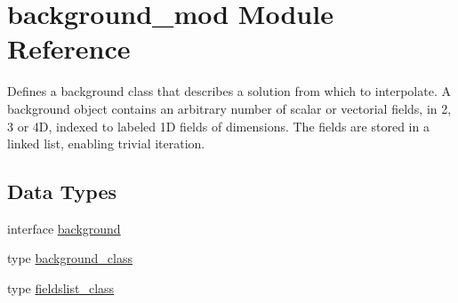 \hypertarget{namespacebackground__mod}{}\section{background\+\_\+mod Module Reference}
\label{namespacebackground__mod}


Defines a background class that describes a solution from which to interpolate. A background object contains an arbitrary number of scalar or vectorial fields, in 2, 3 or 4D, indexed to labeled 1D fields of dimensions. The fields are stored in a linked list, enabling trivial iteration.  


\subsection*{Data Types}
\begin{DoxyCompactItemize}
\item 
interface \mbox{\hyperlink{interfacebackground__mod_1_1background}{background}}
\item 
type \mbox{\hyperlink{structbackground__mod_1_1background__class}{background\+\_\+class}}
\item 
type \mbox{\hyperlink{structbackground__mod_1_1fieldslist__class}{fieldslist\+\_\+class}}
\end{DoxyCompactItemize}
